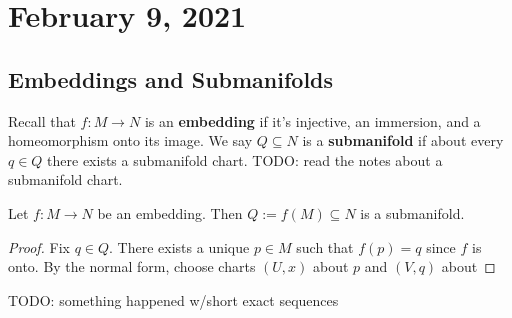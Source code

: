\section{February 9, 2021}
\subsection{Embeddings and Submanifolds}
Recall that $f \colon M \to N$ is an \textbf{embedding} if it's injective, an immersion, and a homeomorphism onto its image. We say $Q \subseteq N$ is a \textbf{submanifold} if about every $q \in Q$ there exists a submanifold chart. {\color{burntorange} TODO: read the notes about a submanifold chart}.

\begin{theorem}
    Let $f \colon M \to N$ be an embedding. Then $Q:= f(M) \subseteq N$ is a submanifold.
\end{theorem}
\begin{proof}
    Fix $q \in Q$. There exists a unique $p \in M$ such that $f(p)=q$ since $f$ is onto. By the normal form, choose charts $(U,x)$ about $p$ and $(V,q)$ about
\end{proof}
{\color{burntorange} TODO: something happened w/short exact sequences}
